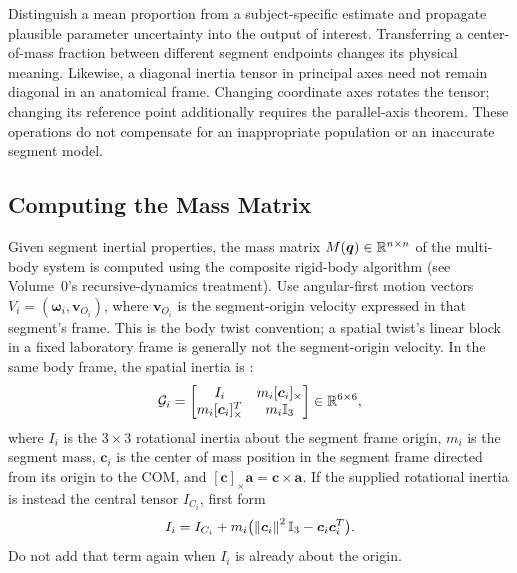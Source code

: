 Distinguish a mean proportion from a subject-specific estimate and propagate
plausible parameter uncertainty into the output of interest. Transferring a
center-of-mass fraction between different segment endpoints changes its
physical meaning. Likewise, a diagonal inertia tensor in principal axes need
not remain diagonal in an anatomical frame. Changing coordinate axes rotates
the tensor; changing its reference point additionally requires the parallel-axis
theorem. These operations do not compensate for an inappropriate population
or an inaccurate segment model.

\subsection{Computing the Mass Matrix}

Given segment inertial properties, the mass matrix $M(\bm{q}) \in \mathbb{R}^{n \times n}$
of the multi-body system is computed using the composite rigid-body algorithm
(see Volume~0's recursive-dynamics treatment). Use angular-first motion
vectors $V_i=(\bm{\omega}_i,\bm{v}_{O_i})$, where $\bm{v}_{O_i}$ is the
segment-origin velocity expressed in that segment's frame. This is the body
twist convention; a spatial twist's linear block in a fixed laboratory frame
is generally not the segment-origin velocity. In the same body frame,
the spatial inertia is \cite{FeatherstoneSpatialV1Review}:
\begin{equation}
  \mathcal{G}_i = \begin{bmatrix} I_i & m_i [\bm{c}_i]_\times \\
  m_i [\bm{c}_i]_\times^T & m_i \mathbb{I}_3 \end{bmatrix} \in \mathbb{R}^{6 \times 6},
  \label{eq:ch2:spatial-inertia}
\end{equation}
where $I_i$ is the $3 \times 3$ rotational inertia about the segment frame origin,
$m_i$ is the segment mass, $\bm{c}_i$ is the center of mass position in the segment
frame directed from its origin to the COM, and
$[\bm{c}]_\times\bm{a}=\bm{c}\times\bm{a}$. If the supplied rotational
inertia is instead the central tensor $I_{C_i}$, first form
\begin{equation}
 I_i=I_{C_i}+m_i\bigl(\left\lVert \bm{c}_i \right\rVert^2\mathbb{I}_3
              -\bm{c}_i\bm{c}_i^T\bigr).
 \label{eq:ch2:parallel-axis}
\end{equation}
Do not add that term again when $I_i$ is already about the origin.

